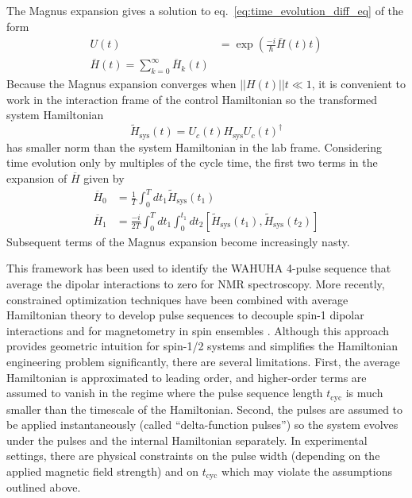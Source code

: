 \documentclass[twocolumn, aps, 10pt]{revtex4-2}
\begin{document}
The Magnus expansion \cite{Blanes_2009} gives a solution to eq.~\ref{eq:time_evolution_diff_eq} of the form
\begin{align}
    U(t) &= \exp \left( \frac{-i}{\hbar} \overline{H}(t) t \right) \\
    \overline{H}(t) = \sum_{k=0}^{\infty} \overline{H}_k(t)
\end{align}
Because the Magnus expansion converges when $||H(t)||t \ll 1$, it is convenient to work in the interaction frame of the control Hamiltonian
so the transformed system Hamiltonian
\begin{equation*}
    \tilde{H}_\text{sys}(t) = U_c(t) H_\text{sys} U_c(t)^\dagger
\end{equation*}
has smaller norm than the system Hamiltonian in the lab frame.
Considering time evolution only by multiples of the cycle time,
the first two terms in the expansion of $\overline{H}$ given by
\begin{align}
    \overline{H}_0 &= \frac{1}{T} \int_0^T dt_1
        \tilde{H}_\text{sys}(t_1) \\
    \overline{H}_1 &= \frac{-i}{2T} \int_0^T dt_1 \int_0^{t_1} dt_2
        [\tilde{H}_\text{sys}(t_1), \tilde{H}_\text{sys}(t_2)]
\end{align}
Subsequent terms of the Magnus expansion become increasingly nasty.


This framework has been used to identify the WAHUHA 4-pulse sequence \cite{PhysRevLett.20.180} that average the dipolar interactions to zero for NMR spectroscopy. More recently, constrained optimization techniques have been combined with average Hamiltonian theory to develop pulse sequences to decouple spin-1 dipolar interactions \cite{PhysRevLett.119.183603} and for magnetometry in spin ensembles \cite{O_Keeffe_2019}.
Although this approach provides geometric intuition for spin-1/2 systems and simplifies the Hamiltonian engineering problem significantly, there are several limitations. First, the average Hamiltonian is approximated to leading order, and higher-order terms are assumed to vanish in the regime where the pulse sequence length $t_\text{cyc}$ is much smaller than the timescale of the Hamiltonian. Second, the pulses are assumed to be applied instantaneously (called ``delta-function pulses'') so the system evolves under the pulses and the internal Hamiltonian separately.
In experimental settings, there are physical constraints on the pulse width (depending on the applied magnetic field strength) and on $t_\text{cyc}$ which may violate the assumptions outlined above.
\end{document}
